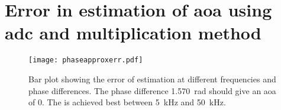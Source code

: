 \graphicspath{{figures/appendix/}}
\chapter{Error in estimation of \gls{aoa} using \gls{adc} and multiplication method}\label	{appendix:aoaestimationerr}
\begin{figure} [h]
\centering
\texttt{[image: phaseapproxerr.pdf]}
\caption{Bar plot showing the error of estimation at different frequencies and phase differences. The phase difference \SI{1.570}{\radian} should give an \gls{aoa} of 0. The is achieved best between \SI{5}{\kilo\hertz} and \SI{50}{\kilo\hertz}.}
\label{fig:app:aoaestimationerr}
\end{figure}